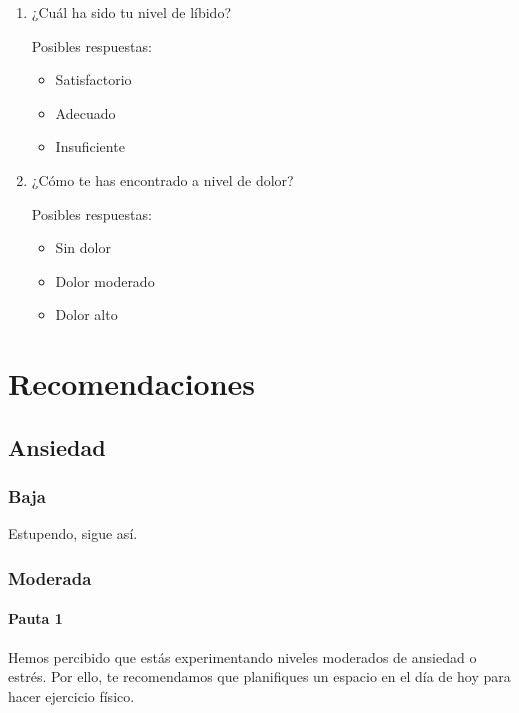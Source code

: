 \begin{enumerate}
                \item ¿Cuál ha sido tu nivel de líbido?
                
                Posibles respuestas:
                    \begin{itemize}
                        \item Satisfactorio  
                        \item Adecuado
                        \item Insuficiente
                    \end{itemize}
                    
                \item ¿Cómo te has encontrado a nivel de dolor?
                
                Posibles respuestas:
                    \begin{itemize}
                        \item Sin dolor 
                        \item Dolor moderado
                        \item Dolor alto
                    \end{itemize}
                    
            \end{enumerate}
\chapter{Recomendaciones}
\label{chapter:recomendaciones}

    \section{Ansiedad}
        \subsection{Baja}
            Estupendo, sigue así. 
        \subsection{Moderada}
            \subsubsection{Pauta 1}
                Hemos percibido que estás experimentando niveles moderados de ansiedad o estrés. 
                Por ello, te recomendamos que planifiques un espacio en el día de hoy para hacer ejercicio físico.

